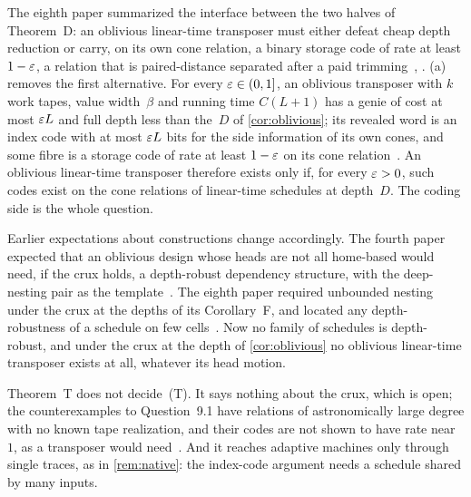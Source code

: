 The eighth paper summarized the interface between the two halves of Theorem~D: an oblivious linear-time transposer must either
defeat cheap depth reduction or carry, on its own cone relation, a binary storage code of rate at least $1-\varepsilon$, a relation
that is paired-distance separated after a paid trimming~\cite[Section~9]{EighthPaper2026},
\cite[Theorem~3.3 and Corollary~3.8]{DirectedRecovery2026}. (a) removes the first alternative. For every
$\varepsilon\in(0,1]$, an oblivious transposer with $k$ work tapes, value width~$\beta$ and running time $C(L+1)$ has a genie of cost at
most $\varepsilon L$ and full depth less than the~$D$ of \cref{cor:oblivious}; its revealed word is an index code with at most $\varepsilon L$
bits for the side information of its own cones, and some fibre is a storage code of rate at least $1-\varepsilon$ on its cone
relation~\cite[Theorem~4.10 and Remark~4.9(b)]{FourthPaper2026}. An oblivious linear-time transposer therefore exists only if,
for every $\varepsilon>0$, such codes exist on the cone relations of linear-time schedules at depth~$D$. The coding side is the whole
question.

Earlier expectations about constructions change accordingly. The fourth paper expected that an oblivious design whose heads are
not all home-based would need, if the crux holds, a depth-robust dependency structure, with the deep-nesting pair as the
template~\cite[Section~7]{FourthPaper2026}. The eighth paper required unbounded nesting under the crux at the depths of its
Corollary~F, and located any depth-robustness of a schedule on few cells~\cite[Section~9]{EighthPaper2026}. Now no family of
schedules is depth-robust, and under the crux at the depth of \cref{cor:oblivious} no oblivious linear-time transposer exists at
all, whatever its head motion.

Theorem~T does not decide~(T). It says nothing about the crux, which is open; the counterexamples to Question~9.1 have relations
of astronomically large degree with no known tape realization, and their codes are not shown to have rate near~$1$, as a
transposer would need~\cite{StorageCodes2026}. And it reaches adaptive machines only through single traces, as
in \cref{rem:native}: the index-code argument needs a schedule shared by many inputs.
